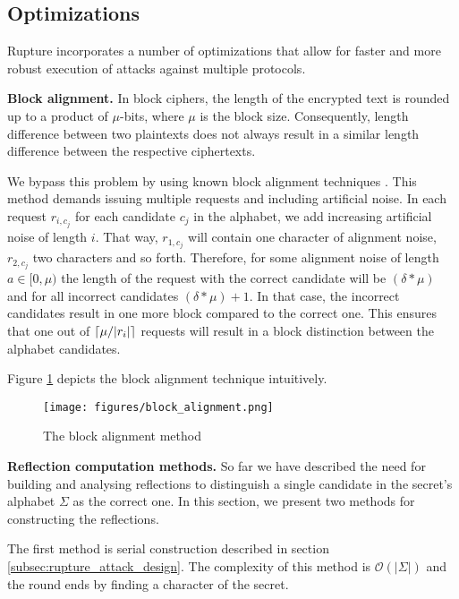 \subsection{Optimizations}\label{subsec:optimizations}

Rupture incorporates a number of optimizations that allow for faster and more
robust execution of attacks against multiple protocols.

\noindent \textbf{Block alignment.}\label{subsec:blockalign}
In block ciphers, the length of the encrypted text is rounded up to a product of
$\mu$-bits, where $\mu$ is the block size. Consequently, length difference
between two plaintexts does not always result in a similar length difference between the
respective ciphertexts.

We bypass this problem by using known block alignment techniques
\cite{moller2014poodle}. This method demands issuing multiple requests
and including artificial noise. In each request $r_{i, c_j}$
for each candidate $c_j$ in the alphabet, we add increasing artificial
noise of length $i$. That way, $r_{1, c_j}$ will contain one character of
alignment noise, $r_{2, c_j}$ two characters and so forth. Therefore, for some
alignment noise of length $a \in [0, \mu)$ the length of the request with the
correct candidate will be $(\delta*\mu)$ and for all incorrect candidates
$(\delta*\mu)+1$. In that case, the incorrect candidates result in one more
block compared to the correct one. This ensures that one out of $\lceil\mu /
|r_i|\rceil$ requests will result in a block distinction between the alphabet
candidates.

Figure \ref{fig:block_alignment} depicts the block alignment technique
intuitively.

   \begin{figure}[thpb]
      \centering
          \texttt{[image: figures/block\_alignment.png]}
      \caption{The block alignment method}
      \label{fig:block_alignment}
   \end{figure}

\noindent \textbf{Reflection computation methods.}\label{subsec:reflectionmethods}
So far we have described the need for building and analysing reflections to
distinguish a single candidate in the secret's alphabet $\Sigma$ as the correct
one. In this section, we present two methods for constructing the reflections.

The first method is serial construction described in section
\ref{subsec:rupture_attack_design}. The complexity of this method is
$\mathcal{O}(|\Sigma|)$ and the round ends by finding a character of the secret.

